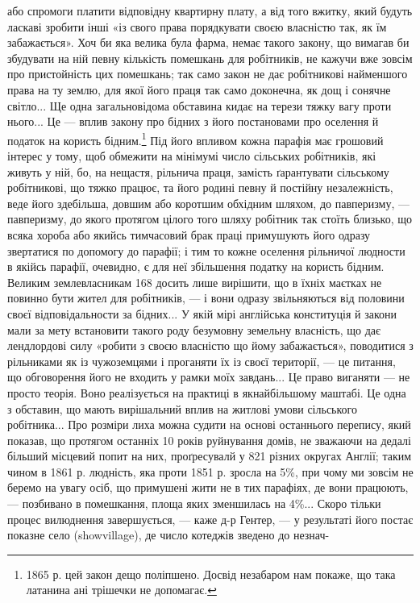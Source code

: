 \parcont{}  %
або спромоги платити відповідну квартирну плату, а від того
вжитку, який будуть ласкаві зробити інші «із свого права порядкувати
своєю власністю так, як їм забажається». Хоч би яка
велика була фарма, немає такого закону, що вимагав би збудувати
на ній певну кількість помешкань для робітників, не кажучи
вже зовсім про пристойність цих помешкань; так само
закон не дає робітникові найменшого права на ту землю, для якої
його праця так само доконечна, як дощ і сонячне світло... Ще
одна загальновідома обставина кидає на терези тяжку вагу проти
нього... Це — вплив закону про бідних з його постановами про
оселення й податок на користь бідним.\footnote{
1865 р. цей закон дещо поліпшено. Досвід незабаром нам покаже,
що така латанина ані трішечки не допомагає.
} Під його впливом кожна
парафія має грошовий інтерес у тому, щоб обмежити на мінімумі
число сільських робітників, які живуть у ній, бо, на нещастя,
рільнича праця, замість ґарантувати сільському робітникові,
що тяжко працює, та його родині певну й постійну незалежність,
веде його здебільша, довшим або коротшим обхідним
шляхом, до павперизму, — павперизму, до якого протягом цілого
того шляху робітник так стоїть близько, що всяка хороба
або якийсь тимчасовий брак праці примушують його одразу звертатися
по допомогу до парафії; і тим то кожне оселення рільничої
людности в якійсь парафії, очевидно, є для неї збільшення
податку на користь бідним. Великим землевласникам 168 досить
лише вирішити, що в їхніх маєтках не повинно бути жител для
робітників, — і вони одразу звільняються від половини своєї
відповідальности за бідних... У якій мірі англійська конституція
й закони мали за мету встановити такого роду безумовну
земельну власність, що дає лендлордові силу «робити з своєю
власністю що йому забажається», поводитися з рільниками
як із чужоземцями і проганяти їх із своєї території, — це питання,
що обговорення його не входить у рамки моїх завдань...
Це право виганяти — не просто теорія. Воно реалізується
на практиці в якнайбільшому маштабі. Це одна з обставин, що
мають вирішальний вплив на житлові умови сільського робітника...
Про розміри лиха можна судити на основі останнього
перепису, який показав, що протягом останніх 10 років руйнування
домів, не зважаючи на дедалі більший місцевий попит на
них, проґресувалй у 821 різних округах Англії; таким чином в
1861 р. людність, яка проти 1851 р. зросла на 5\%, при чому
ми зовсім не беремо на увагу осіб, що примушені жити не в тих
парафіях, де вони працюють, — позбивано в помешкання, площа
яких зменшилась на 4\%... Скоро тільки процес вилюднення
завершується, — каже д-р Гентер, — у результаті його постає
показне село (showvillage), де число котеджів зведено до незнач-

